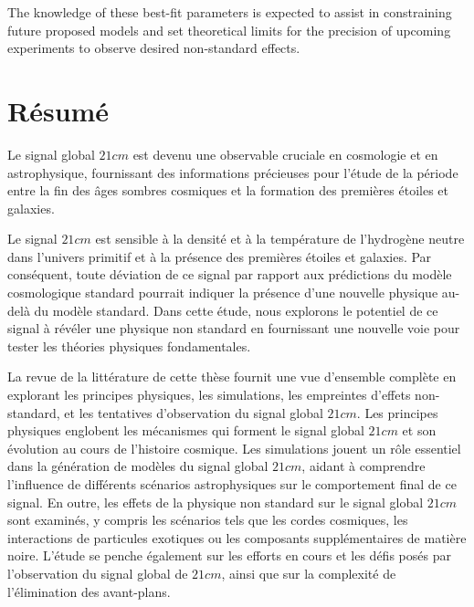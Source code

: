 \documentclass[12pt, TexShade, letterpaper]{report}
\begin{document}
The knowledge of these best-fit parameters is expected to assist in constraining future proposed models and set theoretical limits for the precision of upcoming experiments to observe desired non-standard effects.\par
\chapter*{Résumé}
	\label{chap:frAbstract}
Le signal global $21cm$ est devenu une observable cruciale en cosmologie et en astrophysique, fournissant des informations précieuses pour l'étude de la période entre la fin des âges sombres cosmiques et la formation des premières étoiles et galaxies.\par

Le signal $21cm$ est sensible à la densité et à la température de l'hydrogène neutre dans l'univers primitif et à la présence des premières étoiles et galaxies. Par conséquent, toute déviation de ce signal par rapport aux prédictions du modèle cosmologique standard pourrait indiquer la présence d'une nouvelle physique au-delà du modèle standard. Dans cette étude, nous explorons le potentiel de ce signal à révéler une physique non standard en fournissant une nouvelle voie pour tester les théories physiques fondamentales.\par 

La revue de la littérature de cette thèse fournit une vue d'ensemble complète en explorant les principes physiques, les simulations, les empreintes d'effets non-standard, et les tentatives d'observation du signal global $21cm$. Les principes physiques englobent les mécanismes qui forment le signal global $21cm$ et son évolution au cours de l'histoire cosmique. Les simulations jouent un rôle essentiel dans la génération de modèles du signal global $21cm$, aidant à comprendre l'influence de différents scénarios astrophysiques sur le comportement final de ce signal. En outre, les effets de la physique non standard sur le signal global $21cm$ sont examinés, y compris les scénarios tels que les cordes cosmiques, les interactions de particules exotiques ou les composants supplémentaires de matière noire. L'étude se penche également sur les efforts en cours et les défis posés par l'observation du signal global de $21cm$, ainsi que sur la complexité de l'élimination des avant-plans.\par
\end{document}

